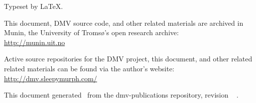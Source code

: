 
Typeset by \LaTeX.

This document, \gls{DMV} source code, and other related materials are archived
in Munin, the University of Tromsø's open research archive: \\
\url{http://munin.uit.no}

Active source repositories for the \gls{DMV} project, this document, and other
related related materials can be found via the author's website: \\
\url{http://dmv.sleepymurph.com/}

This document generated \GITAuthorDate\ from the dmv-publications
repository, revision
\ifx\GITTags\empty
\GITAbrHash
\else
\GITAbrHash\ \GITTags
\fi
.
